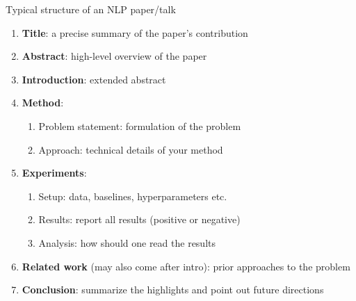\documentclass[usenames,dvipsnames,notes]{beamer}
\begin{document}
\begin{frame}
    {Typical structure of an NLP paper/talk}
    \begin{enumerate}
        \item \textbf{Title}: a precise summary of the paper's contribution
        \item \textbf{Abstract}: high-level overview of the paper
        \item \textbf{Introduction}: extended abstract
        \item \textbf{Method}: 
            \begin{enumerate}
                \item Problem statement: formulation of the problem
                \item Approach: technical details of your method
            \end{enumerate}
        \item \textbf{Experiments}:
            \begin{enumerate}
                \item Setup: data, baselines, hyperparameters etc.
                \item Results: report all results (positive or negative)
                \item Analysis: how should one read the results 
            \end{enumerate}
        \item \textbf{Related work} (may also come after intro): prior approaches to the problem
        \item \textbf{Conclusion}: summarize the highlights and point out future directions
    \end{enumerate}
\end{frame}
\end{document}
